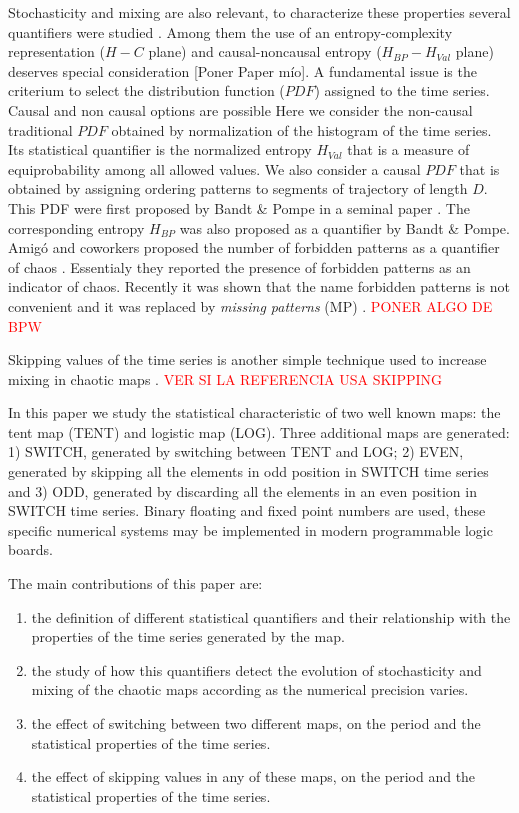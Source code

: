 Stochasticity and mixing are also relevant, to characterize these properties several quantifiers were studied \cite{DeMicco2009}.
Among them the use of an entropy-complexity representation ($H-C$ plane) and causal-noncausal entropy ($H_{BP}-H_{Val}$ plane) deserves special consideration \cite{Rosso2007C,DeMicco2008,DeMicco2011,DeMicco2009,Rosso2009}[Poner Paper mío].
A fundamental issue is the criterium to select the distribution function ($PDF$) assigned to the time series.
Causal and non causal options are possible
Here we consider the non-causal traditional $PDF$ obtained by normalization of the histogram of the time series.
Its statistical quantifier is the normalized entropy $H_{Val}$ that is a measure of equiprobability among all allowed values.
We also consider a causal $PDF$ that is obtained by assigning ordering patterns to segments of trajectory of length $D$.
This PDF were first proposed by Bandt \& Pompe in a seminal paper \cite{Pompe2002}.
The corresponding entropy $H_{BP}$ was also proposed as a quantifier by Bandt \& Pompe.
Amig\'o and coworkers proposed the number of forbidden patterns as a quantifier of chaos \cite{Amigo2007b}.
Essentialy they reported the presence of forbidden patterns as an indicator of chaos.
Recently it was shown that the name forbidden patterns is not convenient and it was replaced by \textit{missing patterns }(MP) \cite{Rosso2012b}.
\textcolor{red}{PONER ALGO DE BPW}

Skipping values of the time series is another simple technique used to increase mixing in chaotic maps \cite{DeMicco2008}.
\textcolor{red}{VER SI LA REFERENCIA USA SKIPPING}

In this paper we study the statistical characteristic of two well known maps: the tent map (TENT) and logistic map (LOG).
Three additional maps are generated: 1) SWITCH, generated by switching between TENT and LOG; 2) EVEN, generated by skipping all the elements in odd position in SWITCH time series and 3) ODD, generated by discarding all the elements in an even position in SWITCH time series.
Binary floating and fixed point numbers are used, these specific numerical systems may be implemented in modern programmable logic boards.

The main contributions of this paper are:
\begin{enumerate}
\item the definition of different statistical quantifiers and their relationship with the properties of the time series generated by the map.
\item the study of how this quantifiers detect the evolution of stochasticity and mixing of the chaotic maps according as the numerical precision varies.
\item the effect of switching between two different maps, on the period and the statistical properties of the time series.
\item the effect of skipping values in any of these maps, on the period and the statistical properties of the time series.
\end{enumerate}

